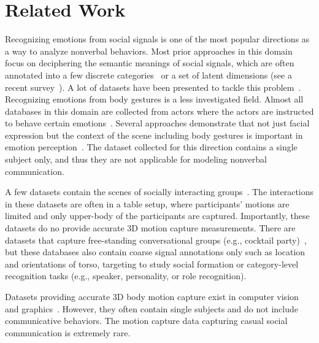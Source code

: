 \section{Related Work}
Recognizing emotions from social signals is one of the most popular directions as a way to analyze nonverbal behaviors. Most prior approaches in this domain focus on deciphering the semantic meanings of social signals, which are often annotated into a few discrete categories~\cite{ekman1969} or a set of latent dimensions\cite{osgood1952nature, russell1979affective, plutchik2001nature} (see a recent survey~\cite{noroozi2018survey}). A lot of datasets have been presented to tackle this problem~\cite{lucey2010extended,gross2010multi,dhall2013emotion, mollahosseini2016facial, fabian2016emotionet, mollahosseini2017affectnet}. Recognizing emotions from body gestures is a less investigated field. Almost all databases in this domain are collected from actors where the actors are instructed to behave certain emotions~\cite{gunes2006bimodal, banziger2012introducing, de2004modeling}. Several approaches demonstrate that not just facial expression but the context of the scene including body gestures is important in emotion perception~\cite{barrett2011context, aviezer2008angry}. The dataset collected for this direction contains a single subject only, and thus they are not applicable for modeling nonverbal communication.

A few datasets contain the scenes of socially interacting groups~\cite{mccowan2005ami, zancanaro2006automatic, lepri2012connecting, rehg2013decoding}. The interactions in these datasets are often in a table setup, where participants’ motions are limited and only upper-body of the participants are captured. Importantly, these datasets do no provide accurate 3D motion capture measurements. There are datasets that capture free-standing conversational groups (e.g., cocktail party)~\cite{Zen-10, Cristani-11, SALSA-15, farenzena2009social}, but these databases also contain coarse signal annotations only such as location and orientations of torso, targeting to study social formation or category-level recognition tasks (e.g., speaker, personality, or role recognition).

Datasets providing accurate 3D body motion capture exist in computer vision and graphics~\cite{gross2001cmu, h36m_pami, sigal2010humaneva}.  However, they often contain single subjects and do not include communicative behaviors. The motion capture data capturing casual social communication is extremely rare. 

